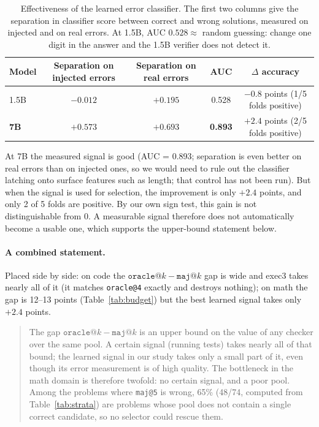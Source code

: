 \documentclass[11pt,a4paper]{article}
\begin{document}
\begin{table}[htbp]
\centering
\small
\begin{tabular}{@{}l c c c c@{}}
\toprule
Model & Separation on injected errors & Separation on real errors & AUC & $\Delta$ accuracy\\
\midrule
1.5B & $-0.012$ & $+0.195$ & 0.528 & $-0.8$ points (1/5 folds positive)\\
\textbf{7B} & $\mathbf{+0.573}$ & $\mathbf{+0.693}$ & \textbf{0.893} & $\mathbf{+2.4}$ points (2/5 folds positive)\\
\bottomrule
\end{tabular}
\caption{Effectiveness of the learned error classifier. The first two columns give the separation in
classifier score between correct and wrong solutions, measured on injected and on real errors. At 1.5B, AUC $0.528 \approx$ random guessing: change one digit in the
answer and the 1.5B verifier does not detect it.}
\label{tab:clf}
\end{table}

At 7B the measured signal is good (AUC = 0.893; separation is even better on real errors than on injected ones, so we would need to rule out the classifier latching onto surface features such as length; that control has not been run). But when the signal is used for selection, the improvement is only $+2.4$ points, and only 2 of 5 folds are positive. By our own sign test, this gain is not distinguishable from 0. A measurable signal therefore does not automatically become a usable one, which supports the upper-bound statement below.

\paragraph{A combined statement.}
Placed side by side: on code the $\texttt{oracle@}k-\texttt{maj@}k$ gap is wide and exec3 takes nearly all of it (it matches \texttt{oracle@4} exactly and destroys nothing); on math the gap is 12--13 points (Table~\ref{tab:budget}) but the best learned signal takes only $+2.4$ points.

\begin{quote}
The gap $\texttt{oracle@}k - \texttt{maj@}k$ is an upper bound on the value of any checker over the same pool. A certain signal (running tests) takes nearly all of that bound; the learned signal in our study takes only a small part of it, even though its error measurement is of high quality. The bottleneck in the math domain is therefore twofold: no certain signal, and a poor pool. Among the problems where \texttt{maj@5} is wrong, 65\% (48/74, computed from Table~\ref{tab:strata}) are problems whose pool does not contain a single correct candidate, so no selector could rescue them.
\end{quote}
\end{document}
